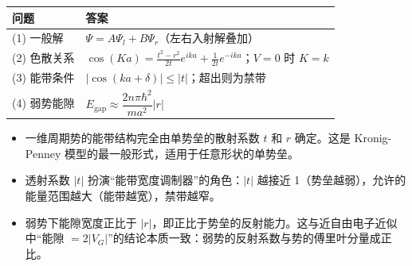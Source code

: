 \begin{formulabox}[答案汇总]
\begin{center}
\begin{tabular}{ll}
\toprule
\textbf{问题} & \textbf{答案} \\
\midrule
(1) 一般解 & $\Psi=A\Psi_l+B\Psi_r$（左右入射解叠加） \\
(2) 色散关系 & $\cos(Ka)=\frac{t^2-r^2}{2t}e^{ika}+\frac{1}{2t}e^{-ika}$；$V=0$ 时 $K=k$ \\
(3) 能带条件 & $|\cos(ka+\delta)|\le|t|$；超出则为禁带 \\
(4) 弱势能隙 & $E_{\text{gap}}\approx\dfrac{2n\pi\hbar^2}{ma^2}|r|$ \\
\bottomrule
\end{tabular}
\end{center}
\end{formulabox}

\begin{insightbox}[物理图像]
\begin{itemize}
    \item 一维周期势的能带结构完全由单势垒的散射系数 $t$ 和 $r$ 确定。这是 Kronig-Penney 模型的最一般形式，适用于任意形状的单势垒。
    \item 透射系数 $|t|$ 扮演``能带宽度调制器''的角色：$|t|$ 越接近 1（势垒越弱），允许的能量范围越大（能带越宽），禁带越窄。
    \item 弱势下能隙宽度正比于 $|r|$，即正比于势垒的反射能力。这与近自由电子近似中``能隙 $=2|V_G|$''的结论本质一致：弱势的反射系数与势的傅里叶分量成正比。
\end{itemize}
\end{insightbox}
